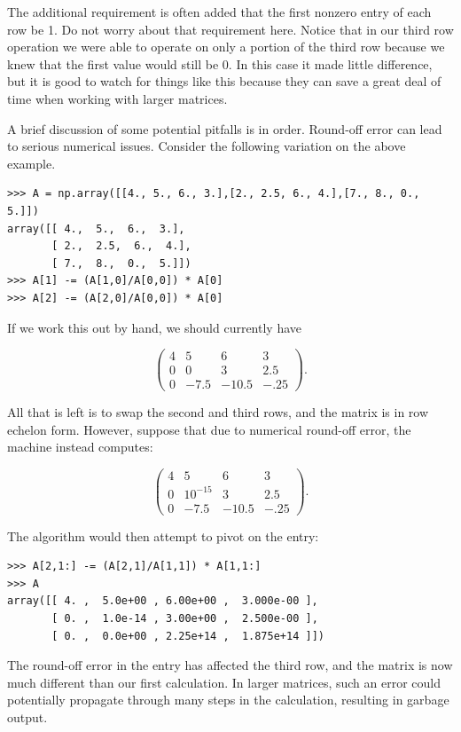 The additional requirement is often added that the first nonzero entry of each row be 1. Do not worry about that requirement here.
Notice that in our third row operation we were able to operate on only a portion of the third row because we knew that the first value would still be 0. In this case it made little difference, but it is good to watch for things like this because they can save a great deal of time when working with larger matrices.

A brief discussion of some potential pitfalls is in order.
Round-off error can lead to serious numerical issues. Consider the
following variation on the above example.

\begin{lstlisting}
>>> A = np.array([[4., 5., 6., 3.],[2., 2.5, 6., 4.],[7., 8., 0., 5.]])
array([[ 4.,  5.,  6.,  3.],
       [ 2.,  2.5,  6.,  4.],
       [ 7.,  8.,  0.,  5.]])
>>> A[1] -= (A[1,0]/A[0,0]) * A[0]
>>> A[2] -= (A[2,0]/A[0,0]) * A[0]
\end{lstlisting}

If we work this out by hand, we should currently have

\[
\begin{pmatrix}
4&5&6&3 \\
0&0&3&2.5 \\
0&-7.5&-10.5&-.25
\end{pmatrix}.
\]

All that is left is to swap the second and third rows, and the matrix is in row echelon form. However, suppose that due to numerical round-off error, the machine instead computes:

\[
\begin{pmatrix}
4&5&6&3 \\
0&10^{-15}&3&2.5 \\
0&-7.5&-10.5&-.25
\end{pmatrix}.
\]

The algorithm would then attempt to pivot on the  entry:

\begin{lstlisting}
>>> A[2,1:] -= (A[2,1]/A[1,1]) * A[1,1:]
>>> A
array([[ 4. ,  5.0e+00 , 6.00e+00 ,  3.000e-00 ],
       [ 0. ,  1.0e-14 , 3.00e+00 ,  2.500e-00 ],
       [ 0. ,  0.0e+00 , 2.25e+14 ,  1.875e+14 ]])
\end{lstlisting}

The round-off error in the  entry has affected the third
row, and the matrix is now much different than our first calculation. In larger matrices, such an error could potentially propagate through many steps in the calculation, resulting in garbage output.

